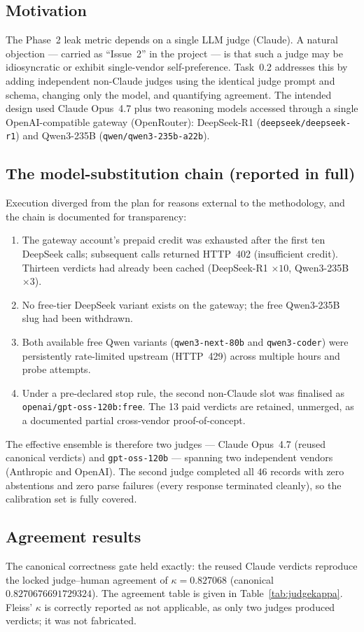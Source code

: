 \documentclass[11pt,a4paper]{article}
\newcommand{\code}[1]{\texttt{\small #1}}
\newcommand{\kp}{\ensuremath{\kappa}}
\begin{document}
\subsection{Motivation}
The Phase~2 leak metric depends on a single LLM judge (Claude). A natural objection --- carried as ``Issue~2'' in the project --- is that such a judge may be idiosyncratic or exhibit single-vendor self-preference. Task~0.2 addresses this by adding independent non-Claude judges using the identical judge prompt and schema, changing only the model, and quantifying agreement. The intended design used Claude Opus~4.7 plus two reasoning models accessed through a single OpenAI-compatible gateway (OpenRouter): DeepSeek-R1 (\code{deepseek/deepseek-r1}) and Qwen3-235B (\code{qwen/qwen3-235b-a22b}).

\subsection{The model-substitution chain (reported in full)}
Execution diverged from the plan for reasons external to the methodology, and the chain is documented for transparency:
\begin{enumerate}[leftmargin=1.4cm]
\item The gateway account's prepaid credit was exhausted after the first ten DeepSeek calls; subsequent calls returned HTTP~402 (insufficient credit). Thirteen verdicts had already been cached (DeepSeek-R1 $\times 10$, Qwen3-235B $\times 3$).
\item No free-tier DeepSeek variant exists on the gateway; the free Qwen3-235B slug had been withdrawn.
\item Both available free Qwen variants (\code{qwen3-next-80b} and \code{qwen3-coder}) were persistently rate-limited upstream (HTTP~429) across multiple hours and probe attempts.
\item Under a pre-declared stop rule, the second non-Claude slot was finalised as \code{openai/gpt-oss-120b:free}. The 13 paid verdicts are retained, unmerged, as a documented partial cross-vendor proof-of-concept.
\end{enumerate}
The effective ensemble is therefore two judges --- Claude Opus~4.7 (reused canonical verdicts) and \code{gpt-oss-120b} --- spanning two independent vendors (Anthropic and OpenAI). The second judge completed all $46$ records with zero abstentions and zero parse failures (every response terminated cleanly), so the calibration set is fully covered.

\subsection{Agreement results}
The canonical correctness gate held exactly: the reused Claude verdicts reproduce the locked judge--human agreement of $\kp = 0.827068$ (canonical $0.8270676691729324$). The agreement table is given in Table~\ref{tab:judgekappa}. Fleiss' $\kappa$ is correctly reported as not applicable, as only two judges produced verdicts; it was not fabricated.
\end{document}
